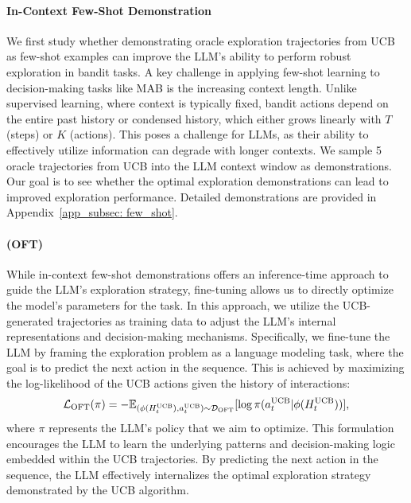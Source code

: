 \paragraph{In-Context Few-Shot Demonstration}

We first study whether demonstrating oracle exploration trajectories from UCB as few-shot examples can improve the LLM's ability to perform robust exploration in bandit tasks. 
A key challenge in applying few-shot learning to decision-making tasks like MAB is the increasing context length. Unlike supervised learning, where context is typically fixed, bandit actions depend on the entire past history or condensed history, which either grows linearly with $T$ (steps) or $K$ (actions). This poses a challenge for LLMs, as their ability to effectively utilize information can degrade with longer contexts. 
We sample 5 oracle trajectories from UCB into the LLM context window as demonstrations. Our goal is to see whether the optimal exploration demonstrations can lead to improved exploration performance. Detailed demonstrations are provided in Appendix~\ref{app_subsec: few_shot}.

\paragraph{\oft (OFT)}

While in-context few-shot demonstrations offers an inference-time approach to guide the LLM's exploration strategy, fine-tuning allows us to directly optimize the model's parameters for the task. In this approach, we utilize the UCB-generated trajectories as training data to adjust the LLM's internal representations and decision-making mechanisms.
Specifically, we fine-tune the LLM by framing the exploration problem as a language modeling task, where the goal is to predict the next action in the sequence. This is achieved by maximizing the log-likelihood of the UCB actions given the history of interactions:
\begin{equation}
    {\mathcal{L}}_{\text{OFT}}(\pi) = -\mathbb{E}_{( \phi(H^{\text{UCB}}_t), a^{\text{UCB}}_t) \sim \mathcal{D}_{\text{OFT}}} 
    [ 
    \log \pi(a^{\text{UCB}}_t|\phi(H^{\text{UCB}}_t))
    ],
\end{equation}
where $\pi$ represents the LLM's policy that we aim to optimize.
This formulation encourages the LLM to learn the underlying patterns and decision-making logic embedded within the UCB trajectories. By predicting the next action in the sequence, the LLM effectively internalizes the optimal exploration strategy demonstrated by the UCB algorithm. 


